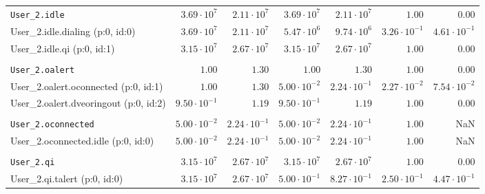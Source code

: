 \begin{table}[htbp]
{\begin{tabular}{lrrrrrr}
\\[-8pt]\texttt{User\_2.idle}                         &  $3.69 \cdot 10^{7}$ &  $2.11 \cdot 10^{7}$ &  $3.69 \cdot 10^{7}$ &  $2.11 \cdot 10^{7}$ &               $1.00$ &               $0.00$ \\
\hspace{3mm}User\_2.idle.dialing (p:0, id:0)          &  $3.69 \cdot 10^{7}$ &  $2.11 \cdot 10^{7}$ &  $5.47 \cdot 10^{6}$ &  $9.74 \cdot 10^{6}$ & $3.26 \cdot 10^{-1}$ & $4.61 \cdot 10^{-1}$ \\
\hspace{3mm}User\_2.idle.qi (p:0, id:1)               &  $3.15 \cdot 10^{7}$ &  $2.67 \cdot 10^{7}$ &  $3.15 \cdot 10^{7}$ &  $2.67 \cdot 10^{7}$ &               $1.00$ &               $0.00$ \\
\\[-8pt]\texttt{User\_2.oalert}                       &               $1.00$ &               $1.30$ &               $1.00$ &               $1.30$ &               $1.00$ &               $0.00$ \\
\hspace{3mm}User\_2.oalert.oconnected (p:0, id:1)     &               $1.00$ &               $1.30$ & $5.00 \cdot 10^{-2}$ & $2.24 \cdot 10^{-1}$ & $2.27 \cdot 10^{-2}$ & $7.54 \cdot 10^{-2}$ \\
\hspace{3mm}User\_2.oalert.dveoringout (p:0, id:2)    & $9.50 \cdot 10^{-1}$ &               $1.19$ & $9.50 \cdot 10^{-1}$ &               $1.19$ &               $1.00$ &               $0.00$ \\
\\[-8pt]\texttt{User\_2.oconnected}                   & $5.00 \cdot 10^{-2}$ & $2.24 \cdot 10^{-1}$ & $5.00 \cdot 10^{-2}$ & $2.24 \cdot 10^{-1}$ &               $1.00$ &                  NaN \\
\hspace{3mm}User\_2.oconnected.idle (p:0, id:0)       & $5.00 \cdot 10^{-2}$ & $2.24 \cdot 10^{-1}$ & $5.00 \cdot 10^{-2}$ & $2.24 \cdot 10^{-1}$ &               $1.00$ &                  NaN \\
\\[-8pt]\texttt{User\_2.qi}                           &  $3.15 \cdot 10^{7}$ &  $2.67 \cdot 10^{7}$ &  $3.15 \cdot 10^{7}$ &  $2.67 \cdot 10^{7}$ &               $1.00$ &               $0.00$ \\
\hspace{3mm}User\_2.qi.talert (p:0, id:0)             &  $3.15 \cdot 10^{7}$ &  $2.67 \cdot 10^{7}$ & $5.00 \cdot 10^{-1}$ & $8.27 \cdot 10^{-1}$ & $2.50 \cdot 10^{-1}$ & $4.47 \cdot 10^{-1}$ \\

\end{tabular}}
\end{table}
